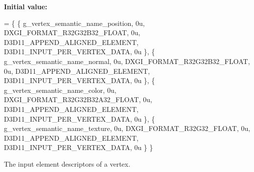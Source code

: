{\bfseries Initial value\+:}
\begin{DoxyCode}
= \{
        \{ g\_vertex\_semantic\_name\_position, 0u, DXGI\_FORMAT\_R32G32B32\_FLOAT,    0u, 
      D3D11\_APPEND\_ALIGNED\_ELEMENT, D3D11\_INPUT\_PER\_VERTEX\_DATA, 0u \},
        \{ g\_vertex\_semantic\_name\_normal,   0u, DXGI\_FORMAT\_R32G32B32\_FLOAT,    0u, 
      D3D11\_APPEND\_ALIGNED\_ELEMENT, D3D11\_INPUT\_PER\_VERTEX\_DATA, 0u \},
        \{ g\_vertex\_semantic\_name\_color,    0u, DXGI\_FORMAT\_R32G32B32A32\_FLOAT, 0u, 
      D3D11\_APPEND\_ALIGNED\_ELEMENT, D3D11\_INPUT\_PER\_VERTEX\_DATA, 0u \},
        \{ g\_vertex\_semantic\_name\_texture,  0u, DXGI\_FORMAT\_R32G32\_FLOAT,       0u, 
      D3D11\_APPEND\_ALIGNED\_ELEMENT, D3D11\_INPUT\_PER\_VERTEX\_DATA, 0u \}
    \}
\end{DoxyCode}
The input element descriptors of a vertex. 